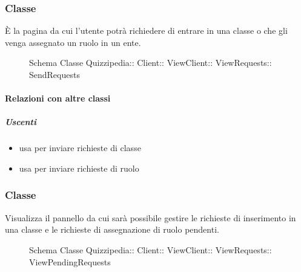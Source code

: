 \subsubsection{Classe }
È la pagina da cui l'utente potrà richiedere di entrare in una classe o che gli venga assegnato un ruolo in un ente.
\begin{figure}[H]
\centering
\noindent{}
\caption[Schema Classe SendRequests]{Schema Classe Quizzipedia:: Client:: ViewClient:: ViewRequests:: SendRequests}
\end{figure}
\paragraph{Relazioni con altre classi}
\subparagraph{Uscenti}
\begin{itemize}
\item usa  per inviare richieste di classe
\item usa  per inviare richieste di ruolo
\end{itemize}
\subsubsection{Classe }
Visualizza il pannello da cui sarà possibile gestire le richieste di inserimento in una classe e le richieste di assegnazione di ruolo pendenti.
\begin{figure}[H]
\centering
\noindent{}
\caption[Schema Classe ViewPendingRequests]{Schema Classe Quizzipedia:: Client:: ViewClient:: ViewRequests:: ViewPendingRequests}
\end{figure}
